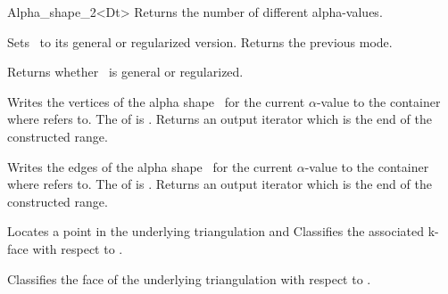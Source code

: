 \begin{ccClassTemplate} {Alpha_shape_2<Dt>}
{Returns the number of different alpha-values.}

% 
% 
% 

{Sets \ccVar\ to its general or regularized version. 
Returns the previous mode.}

{Returns whether \ccVar\ is general or regularized.}

{Writes the vertices of the alpha shape \ccVar\ for the current $\alpha$-value
to the container where  refers to. 
The  of  is .
Returns an output iterator which is the end of the constructed range.}

{Writes the edges 
of the alpha shape \ccVar\ for the current $\alpha$-value
to the container where  refers to. 
The  of  is .
Returns an output iterator which is the end of the constructed range.}



{Locates a point   in the underlying triangulation and Classifies the 
associated k-face with respect to \ccVar.}

{Classifies the face  of the underlying triangulation with respect to \ccVar.}


\end{ccClassTemplate}
